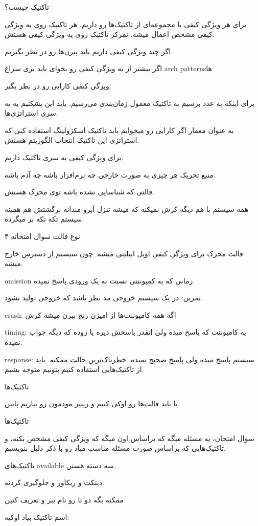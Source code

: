 تاکتیک چیست؟

برای هر ویژگی کیفی با مجموعه‌ای از تاکتیک‌ها رو داریم. هر تاکتیک روی یه ویژگی
کیفی مشخص اعمال میشه. تمرکز تاکتیک روی یه ویژگی کیفی هستش.

اگر چند ویژگی کیفی داریم باید پترن‌ها رو در نظر بگیریم.

اگر بیشتر از یه ویژگی کیفی رو بخوای باید بری سراغ arch patternsها

ویزگی کیفی کارایی رو در نظر بگیر:

برای اینکه به عدد برسیم به تاکتیک معمول زمان‌بندی می‌رسیم. باید این بشکنیم به یه
سری استراتژی‌ها.

به عنوان معمار اگر کارایی رو میخوایم باید تاکتیک اسکژولینگ استفاده کنی که
استراتژی این تاکتیک انتخاب الگوریتم هستش.

برای ویژگی کیفی یه سری تاکتیک داریم.

منبع تحریک هر چیزی به صورت خارجی چه نرم‌افزار باشه چه آدم باشه.

فالتی که شناسایی نشده باشه توی محرک هستش.

همه سیستم با هم دیگه کرش نمیکنه که میشه تنزل آبرو مندانه برگشتش هم همینه سیستم
تکه تکه بر میگرده.

۴ نوع فالت سوال امتحانه

فالت محرک برای ویژگی کیفی اویل ابیلیتی میشه. چون سیستم از دسترس خارج میشه.

omission زمانی که یه کمپوننتی نسبت به یک ورودی پاسخ نمیده.

تمرین: در یک سیستم خروجی مد نظر باشد که خروجی تولید نشود.

crash: اگه همه کامپوننت‌ها از امیژن رنج ببرن میشه کرش

timing: یه کامپوننت که پاسخ میده ولی انقدر پاسخش دیره یا زوده که دیگه جواب نمیده.

response: سیستم پاسخ میده ولی پاسخ صحیح نمیده. خطرناک‌ترین حالت ممکنه. باید از
تاکتیک‌هایی استفاده کنیم بتونیم متوجه بشیم.

تاکتیک‌ها

یا باید فالت‌ها رو اوکی کنیم و ریپیر مودمون رو بیاریم پایین.

تاکتیک‌ها

سوال امتحان، یه مسئله میگه که براساس اون میگه که ویژگی کیفی مشخص بکنه، و
تاکتیک‌هایی که براساس صورت مسئله مناسب میاد رو با ذکر دلیل بنویسیم.

تاکتیک‌های available سه دسته هستن.

دیتکت و ریکاور و جلوگیری کردنه. 

ممکنه بگه دو تا رو نام ببر و تعریف کنین

اسم تاکتیک بیاد اوکیه: 

